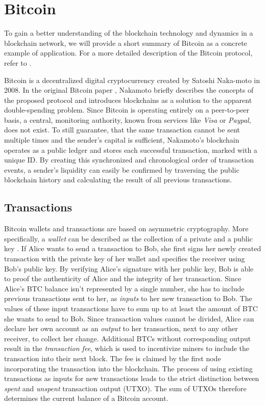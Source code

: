 \documentclass[a4paper,12pt,twoside]{report}
\begin{document}
\section{Bitcoin} \label{bitcoin}
To gain a better understanding of the blockchain technology and dynamics in a blockchain network, we will provide a short summary of Bitcoin as a concrete example of application. For a more detailed description of the Bitcoin protocol, refer to \cite{nakamoto2008bitcoin,antonopoulos2017mastering,okupski2014bitcoin}.

 Bitcoin is a decentralized digital cryptocurrency created by Satoshi Naka-moto in 2008. In the original Bitcoin paper \cite{nakamoto2008bitcoin}, Nakamoto briefly describes the concepts of the proposed protocol and introduces blockchains as a solution to the apparent double-spending problem. Since Bitcoin is operating entirely on a peer-to-peer basis, a central, monitoring authority, known from services like \textit{Visa} or \textit{Paypal}, does not exist. To still guarantee, that the same transaction cannot be sent multiple times and the sender's capital is sufficient, Nakamoto's blockchain operates as a public ledger and stores each successful transaction, marked with a unique ID. By creating this synchronized and chronological order of transaction events, a sender's liquidity can easily be confirmed by traversing the public blockchain history and calculating the result of all previous transactions. \cite{nakamoto2008bitcoin,bitcoinwiki}

\subsection{Transactions}
Bitcoin wallets and transactions are based on asymmetric cryptography. More specifically, a \textit{wallet} can be described as the collection of a private and a public key \cite{okupski2014bitcoin}. If Alice wants to send a transaction to Bob, she first signs her newly created transaction with the private key of her wallet and specifies the receiver using Bob's public key. By verifying Alice's signature with her public key, Bob is able to proof the authenticity of Alice and the integrity of her transaction. Since Alice's BTC balance isn't represented by a single number, she has to include previous transactions sent to her, as \textit{inputs} to her new transaction to Bob. The values of these input transactions have to sum up to at least the amount of BTC she wants to send to Bob. Since transaction values cannot be divided, Alice can declare her own account as an \textit{output} to her transaction, next to any other receiver, to collect her change. Additional BTCs without corresponding output result in the \textit{transaction fee}, which is used to incentivize miners to include the transaction into their next block. The fee is claimed by the first node incorporating the transaction into the blockchain. The process of using existing transactions as inputs for new transactions leads to the strict distinction between \textit{spent} and \textit{unspent} transaction output (UTXO). The sum of UTXOs therefore determines the current balance of a Bitcoin account.
\end{document}
